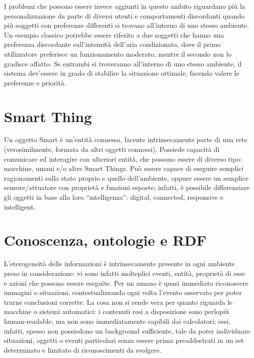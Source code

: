\documentclass[12pt,a4paper,openright,oneside]{report}
\newcommand{\quotes}[1]{``#1''}
\begin{document}
I problemi che possono essere invece aggiunti in questo ambito riguardano più la personalizzazione da parte di diversi utenti e comportamenti discordanti quando più soggetti con preferenze differenti si trovano all'interno di uno stesso ambiente. Un esempio classico potrebbe essere riferito a due soggetti che hanno una preferenza discordante sull'intensità dell'aria condizionata, dove il primo utilizzatore preferisce un funzionamento moderato, mentre il secondo non lo gradisce affatto. Se entrambi si troveranno all'interno di uno stesso ambiente, il sistema dev'essere in grado di stabilire la situazione ottimale, facendo valere le preferenze e priorità.\\


\section{Smart Thing}
\label{sec:smart_thing}
Un oggetto Smart \cite{smartthing} è un'entità connessa, facente intrinsecamente parte di una rete (verosimilmente, formata da altri oggetti connessi). Possiede capacità di comunicare ed interagire con ulteriori entità, che possono essere di diverso tipo: macchine, umani e/o altre Smart Things. Può essere capace di eseguire semplici ragionamenti sullo stato proprio e quello dell'ambiente, oppure essere un semplice sensore/attuatore con proprietà e funzioni esposte; infatti, è possibile differenziare gli oggetti in base alla loro \quotes{intelligenza}: digital, connected, responsive e intelligent.


\section{Conoscenza, ontologie e RDF}
L'eterogeneità delle informazioni è intrinsecamente presente in ogni ambiente preso in considerazione: vi sono infatti molteplici eventi, entità, proprietà di esse e azioni che possono essere eseguite. Per un umano è quasi immediato riconoscere immagini o situazioni, contestualizzando ogni volta l'evento osservato per poter trarne conclusioni corrette. La cosa non si rende vera per quanto riguarda le macchine o sistemi automatici: i contenuti resi a disposizione sono perlopiù human-readable, ma non sono immediatamente capibili dai calcolatori; essi, infatti, spesso non possiedono un background sufficiente, tale da poter individuare situazioni, oggetti o eventi particolari senza essere prima preaddestrati in un set determinato e limitato di riconoscimenti da svolgere.\\
\end{document}
